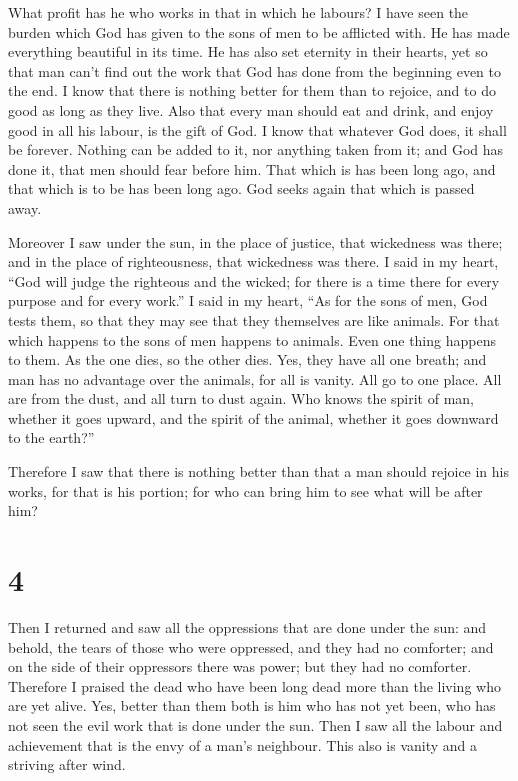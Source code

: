  What profit has he who works in that in which he labours?
 I have seen the burden which God has given to the sons of
men to be afflicted with.  He has made everything beautiful
in its time. He has also set eternity in their hearts, yet so that man
can't find out the work that God has done from the beginning even to the
end.  I know that there is nothing better for them than to
rejoice, and to do good as long as they live.  Also that
every man should eat and drink, and enjoy good in all his labour, is the
gift of God.  I know that whatever God does, it shall be
forever. Nothing can be added to it, nor anything taken from it; and God
has done it, that men should fear before him.  That which
is has been long ago, and that which is to be has been long ago. God
seeks again that which is passed away.

 Moreover I saw under the sun, in the place of justice,
that wickedness was there; and in the place of righteousness, that
wickedness was there.  I said in my heart, ``God will judge
the righteous and the wicked; for there is a time there for every
purpose and for every work.''  I said in my heart, ``As for
the sons of men, God tests them, so that they may see that they
themselves are like animals.  For that which happens to the
sons of men happens to animals. Even one thing happens to them. As the
one dies, so the other dies. Yes, they have all one breath; and man has
no advantage over the animals, for all is vanity.  All go
to one place. All are from the dust, and all turn to dust again.
 Who knows the spirit of man, whether it goes upward, and
the spirit of the animal, whether it goes downward to the earth?''

 Therefore I saw that there is nothing better than that a
man should rejoice in his works, for that is his portion; for who can
bring him to see what will be after him?

\hypertarget{section-3}{%
\section{4}\label{section-3}}

 Then I returned and saw all the oppressions that are done
under the sun: and behold, the tears of those who were oppressed, and
they had no comforter; and on the side of their oppressors there was
power; but they had no comforter.  Therefore I praised the
dead who have been long dead more than the living who are yet alive.
 Yes, better than them both is him who has not yet been, who
has not seen the evil work that is done under the sun.  Then
I saw all the labour and achievement that is the envy of a man's
neighbour. This also is vanity and a striving after wind.

